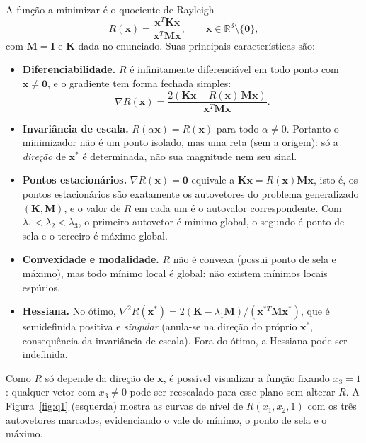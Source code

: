 \documentclass[12pt,a4paper]{article}
\newcommand{\R}{\mathbb{R}}
\begin{document}
A função a minimizar é o quociente de Rayleigh
\begin{equation}
R(\mathbf{x}) = \frac{\mathbf{x}^T\mathbf{K}\mathbf{x}}{\mathbf{x}^T\mathbf{M}\mathbf{x}}, \qquad \mathbf{x}\in\R^3\setminus\{\mathbf{0}\},
\end{equation}
com $\mathbf{M}=\mathbf{I}$ e $\mathbf{K}$ dada no enunciado. Suas principais características são:

\begin{itemize}
  \item \textbf{Diferenciabilidade.} $R$ é infinitamente diferenciável em todo ponto com $\mathbf{x}\neq\mathbf{0}$, e o gradiente tem forma fechada simples:
  \begin{equation}
  \nabla R(\mathbf{x}) = \frac{2\left(\mathbf{K}\mathbf{x} - R(\mathbf{x})\,\mathbf{M}\mathbf{x}\right)}{\mathbf{x}^T\mathbf{M}\mathbf{x}}.
  \end{equation}
  \item \textbf{Invariância de escala.} $R(\alpha\mathbf{x}) = R(\mathbf{x})$ para todo $\alpha\neq 0$. Portanto o minimizador não é um ponto isolado, mas uma reta (sem a origem): só a \emph{direção} de $\mathbf{x}^*$ é determinada, não sua magnitude nem seu sinal.
  \item \textbf{Pontos estacionários.} $\nabla R(\mathbf{x})=\mathbf{0}$ equivale a $\mathbf{K}\mathbf{x}=R(\mathbf{x})\mathbf{M}\mathbf{x}$, isto é, os pontos estacionários são exatamente os autovetores do problema generalizado $(\mathbf{K},\mathbf{M})$, e o valor de $R$ em cada um é o autovalor correspondente. Com $\lambda_1<\lambda_2<\lambda_3$, o primeiro autovetor é mínimo global, o segundo é ponto de sela e o terceiro é máximo global.
  \item \textbf{Convexidade e modalidade.} $R$ não é convexa (possui ponto de sela e máximo), mas todo mínimo local é global: não existem mínimos locais espúrios.
  \item \textbf{Hessiana.} No ótimo, $\nabla^2 R(\mathbf{x}^*) = 2(\mathbf{K}-\lambda_1\mathbf{M})/(\mathbf{x}^{*T}\mathbf{M}\mathbf{x}^*)$, que é semidefinida positiva e \emph{singular} (anula-se na direção do próprio $\mathbf{x}^*$, consequência da invariância de escala). Fora do ótimo, a Hessiana pode ser indefinida.
\end{itemize}

Como $R$ só depende da direção de $\mathbf{x}$, é possível visualizar a função fixando $x_3=1$: qualquer vetor com $x_3\neq 0$ pode ser reescalado para esse plano sem alterar $R$. A Figura~\ref{fig:q1} (esquerda) mostra as curvas de nível de $R(x_1,x_2,1)$ com os três autovetores marcados, evidenciando o vale do mínimo, o ponto de sela e o máximo.
\end{document}
